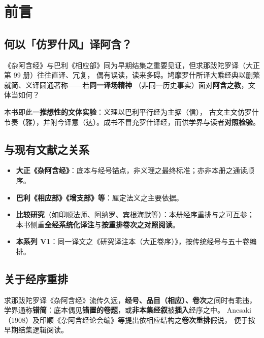 
\chapter*{前言}

\section*{何以「仿罗什风」译阿含？}

《杂阿含经》与巴利《相应部》同为早期结集之重要见证，但求那跋陀罗译（大正第 99 册）往往直译、冗复，
偶有误读，读来多碍。鸠摩罗什所译大乘经典以删繁就简、义译圆通著称——若\textbf{同一译场精神}
（非同一历史事实）面对\textbf{阿含之教}，文体当如何？

本书即此一\textbf{推想性的文体实验}：义理以巴利平行经为主据（信），
古文主文仿罗什节奏（雅），并附今译意（达）。成书不冒充罗什译经，而供学界与读者\textbf{对照检验}。

\section*{与现有文献之关系}

\begin{itemize}
  \item \textbf{大正《杂阿含经》}：底本与经号锚点，非义理之最终标准；亦非本册之通读顺序。
  \item \textbf{巴利《相应部》《增支部》等}：厘定法义之主要依据。
  \item \textbf{比较研究}（如印顺法师、阿纳罗、宾根海默等）：本册经序重排与之可互参；
    本书侧重\textbf{全经系统化译注}与\textbf{按重排卷次之对照阅读}。
  \item \textbf{本系列 V1}：同一译文之《研究译注本（大正卷序）》，按传统经号与五十卷编排。
\end{itemize}

\section*{关于经序重排}

求那跋陀罗译《杂阿含经》流传久远，\textbf{经号、品目（相应）、卷次}之间时有乖违，
学界通称\textbf{错简}：底本偶见\textbf{错置的卷题}，或\textbf{非本集经叙}被\textbf{插入}经序之中。
Anesaki（1908）及印顺《杂阿含经论会编》等提出依相应结构之\textbf{卷次重排}假说，
便于按早期结集逻辑阅读。

